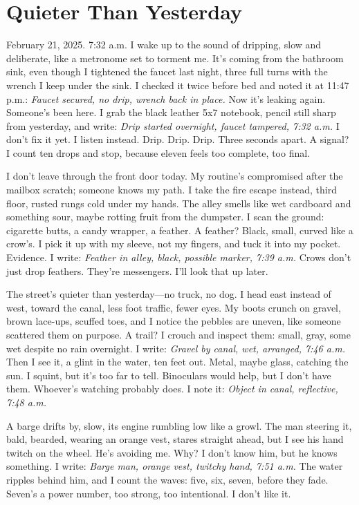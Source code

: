 \documentclass{article}
\begin{document}
\section{Quieter Than Yesterday}

February 21, 2025. 7:32 a.m. I wake up to the sound of dripping, slow and deliberate, like a metronome set to torment me. It's coming from the bathroom sink, even though I tightened the faucet last night, three full turns with the wrench I keep under the sink. I checked it twice before bed and noted it at 11:47 p.m.: \textit{Faucet secured, no drip, wrench back in place.} Now it's leaking again. Someone's been here. I grab the black leather 5x7 notebook, pencil still sharp from yesterday, and write: \textit{Drip started overnight, faucet tampered, 7:32 a.m.} I don't fix it yet. I listen instead. Drip. Drip. Drip. Three seconds apart. A signal? I count ten drops and stop, because eleven feels too complete, too final.

I don't leave through the front door today. My routine's compromised after the mailbox scratch; someone knows my path. I take the fire escape instead, third floor, rusted rungs cold under my hands. The alley smells like wet cardboard and something sour, maybe rotting fruit from the dumpster. I scan the ground: cigarette butts, a candy wrapper, a feather. A feather? Black, small, curved like a crow's. I pick it up with my sleeve, not my fingers, and tuck it into my pocket. Evidence. I write: \textit{Feather in alley, black, possible marker, 7:39 a.m.} Crows don't just drop feathers. They're messengers. I'll look that up later.

The street's quieter than yesterday—no truck, no dog. I head east instead of west, toward the canal, less foot traffic, fewer eyes. My boots crunch on gravel, brown lace-ups, scuffed toes, and I notice the pebbles are uneven, like someone scattered them on purpose. A trail? I crouch and inspect them: small, gray, some wet despite no rain overnight. I write: \textit{Gravel by canal, wet, arranged, 7:46 a.m.} Then I see it, a glint in the water, ten feet out. Metal, maybe glass, catching the sun. I squint, but it's too far to tell. Binoculars would help, but I don't have them. Whoever's watching probably does. I note it: \textit{Object in canal, reflective, 7:48 a.m.}

A barge drifts by, slow, its engine rumbling low like a growl. The man steering it, bald, bearded, wearing an orange vest, stares straight ahead, but I see his hand twitch on the wheel. He's avoiding me. Why? I don't know him, but he knows something. I write: \textit{Barge man, orange vest, twitchy hand, 7:51 a.m.} The water ripples behind him, and I count the waves: five, six, seven, before they fade. Seven's a power number, too strong, too intentional. I don't like it.
\end{document}
